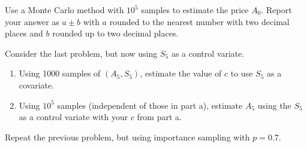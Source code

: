 \documentclass[
]{article}
\begin{document}
Use a Monte Carlo method with \(10^5\) samples to estimate the price
\(A_0\). Report your answer as \(a \pm b\) with \(a\) rounded to the
nearest number with two decimal places and \(b\) rounded up to two
decimal places.

Consider the last problem, but now using \(S_5\) as a control variate.

\begin{enumerate}
\def\labelenumi{\alph{enumi}.}
\item
  Using 1000 samples of \((A_5, S_5)\), estimate the value of \(c\) to
  use \(S_5\) as a covariate.
\item
  Using \(10^5\) samples (independent of those in part a), estimate
  \(A_5\) using the \(S_5\) as a control variate with your \(c\) from
  part a.
\end{enumerate}

Repeat the previous problem, but using importance sampling with
\(p = 0.7\).
\end{document}
